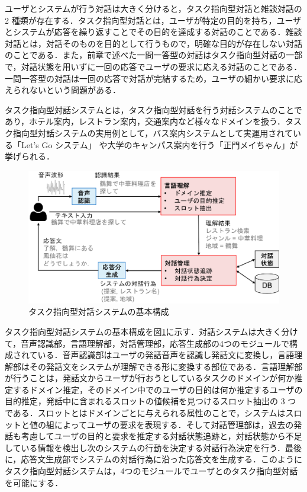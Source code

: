 ユーザとシステムが行う対話は大きく分けると，タスク指向型対話と雑談対話の 2 種類が存在する．タスク指向型対話とは，ユーザが特定の目的を持ち，ユーザとシステムが応答を繰り返すことでその目的を達成する対話のことである．雑談対話とは，対話そのものを目的として行うもので，明確な目的が存在しない対話のことである．また，前章で述べた一問一答型の対話はタスク指向型対話の一部で，対話状態を用いずに一回の応答でユーザの要求に応える対話のことである．一問一答型の対話は一回の応答で対話が完結するため，ユーザの細かい要求に応えられないという問題がある．
\par
タスク指向型対話システムとは，タスク指向型対話を行う対話システムのことであり，ホテル案内，レストラン案内，交通案内など様々なドメインを扱う．タスク指向型対話システムの実用例として，バス案内システムとして実運用されている「Let's Go システム」\cite{letsgo} や大学のキャンパス案内を行う「正門メイちゃん」\cite{mmdagent}が挙げられる．
\par
\begin{figure}[thb]
  \centering
  \includegraphics[width=15cm]{chapter2/system3.eps}
  \caption{タスク指向型対話システムの基本構成}
  \label{fig:taiwasystem}
\end{figure}
タスク指向型対話システムの基本構成を図\ref{fig:taiwasystem}に示す．対話システムは大きく分けて，音声認識部，言語理解部，対話管理部，応答生成部の4つのモジュールで構成されている．音声認識部はユーザの発話音声を認識し発話文に変換し，言語理解部はその発話文をシステムが理解できる形に変換する部位である．言語理解部が行うことは，発話文からユーザが行おうとしているタスクのドメインが何か推定するドメイン推定，そのドメイン中でのユーザの目的は何か推定するユーザの目的推定，発話中に含まれるスロットの値候補を見つけるスロット抽出の 3 つである．スロットとはドメインごとに与えられる属性のことで，システムはスロットと値の組によってユーザの要求を表現する．そして対話管理部は，過去の発話も考慮してユーザの目的と要求を推定する対話状態追跡と，対話状態から不足している情報を検出し次のシステムの行動を決定する対話行為決定を行う．最後に，応答文生成部でシステムの対話行為に沿った応答文を生成する．このようにタスク指向型対話システムは，4つのモジュールでユーザとのタスク指向型対話を可能にする．
